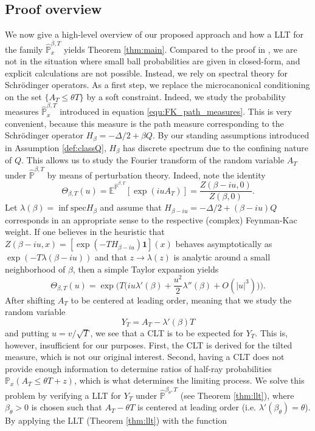 \documentclass[11pt,reqno]{amsart}
\theoremstyle{definition}
\numberwithin{equation}{section}
\newcommand{\<}{\langle}
\renewcommand{\>}{\rangle}
\def\spec{{\rm spec}}
\def\spec{{\mathrm {spec}}}
\def\bbE{{\mathbb{E}}}
\def\bbP{{\mathbb{P}}}
\def\bbPh{{\hat{\mathbb{P}}}}
\begin{document}
\subsection{Proof overview}
\label{sec:proof_idea}
We now give a high-level overview of our proposed approach and how a LLT for the family $\bbPh^{\beta,T}_x$ yields Theorem \ref{thm:main}. Compared to the proof in \cite{ALS}, we are not in the situation where small ball probabilities are given in closed-form, and explicit calculations are not possible. Instead, we rely on spectral theory for Schrödinger operators. As a first step, we replace the microcanonical conditioning on the set $\{ A_T \le \theta T \}$ by a soft constraint. Indeed, we study the probability measures $\bbPh^{\beta,T}_x$ introduced in equation \eqref{equ:FK_path_measures}. This is very convenient, because this measure is the path measure corresponding to the Schrödinger operator $H_\beta = - \Delta/2 + \beta Q$. By our standing assumptions introduced in Assumption \ref{def:classQ}, $H_\beta$ has discrete spectrum due to the confining nature of $Q$. This allows us to study the Fourier transform of the random variable $A_T$ under $\bbPh^{\beta,T}$ by means of perturbation theory. Indeed, note the identity 
\begin{equation}
    \nonumber
    \Theta_{\beta,T}(u) = \bbE^{\bbPh^{\beta,T}}[\exp(iuA_T)] = \frac{Z(\beta-iu,0)}{Z(\beta,0)}.
\end{equation}
Let $\lambda(\beta) = \inf \spec H_\beta$ and assume that  $H_{\beta-iu}= -\Delta/2 + (\beta-iu)Q$ corresponds in an appropriate sense to the respective (complex) Feynman-Kac weight.
If one believes in the heuristic that $Z(\beta-iu,x)=[\exp(-TH_{\beta - iu}) \mathbf 1](x)$ behaves asymptotically as $\exp(-T\lambda(\beta - iu))$ and that $z \to \lambda(z)$ is analytic around a small neighborhood of $\beta$, then a simple Taylor expansion yields
\[\Theta_{\beta,T}(u) = \exp \Big(  T \big( iu \lambda'(\beta) + \frac{u^2}{2} \lambda''(\beta)+O(|u|^3) \big) \Big).\]
After shifting $A_T$ to be centered at leading order, meaning that we  study the random variable  
\[Y_T = A_T - \lambda'(\beta)T\]
and putting $u = v/ \sqrt{T}$, we see that a CLT is to be expected for $Y_T$. This is, however, insufficient for our purposes. First, the CLT is derived for the tilted measure, which is not our original interest. Second, having a CLT does not provide enough information to determine ratios of half-ray probabilities
$\bbP_x( A_T \le \theta T + z)$, which is what determines the limiting process. We solve this problem by verifying a LLT for $Y_T$ under $\bbPh^{\beta_\theta,T}$ (see Theorem \ref{thm:llt}), where $\beta_\theta>0$ is chosen such that $A_T - \theta T$ is centered at leading order (i.e. $\lambda '(\beta_\theta)= \theta$). By applying the LLT (Theorem \ref{thm:llt}) with the function
\end{document}
